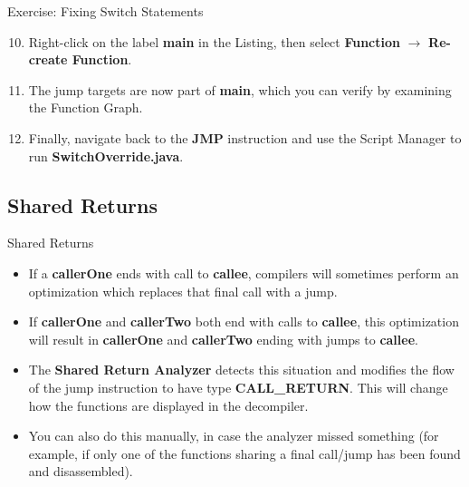 \documentclass{beamer}
\begin{document}
\begin{frame}
\begin{block}{Exercise: Fixing Switch Statements}
\begin{enumerate}
\setcounter{enumi}{9}
\item Right-click on the label \textbf{main} in the Listing, then select \textbf{Function} $\rightarrow$ \textbf{Re-create Function}.
\item The jump targets are now part of \textbf{main}, which you can verify by examining the Function Graph.
\item Finally, navigate back to the \textbf{JMP} instruction and use the Script Manager to run \textbf{SwitchOverride.java}.
\end{enumerate}
\end{block}
\end{frame}

\subsection{Shared Returns}
\begin{frame}
\begin{block}{Shared Returns}
\begin{itemize}
\item If a \textbf{callerOne} ends with call to \textbf{callee}, compilers will sometimes perform an optimization which replaces that final call with a jump.
\item If \textbf{callerOne} and \textbf{callerTwo} both end with calls to \textbf{callee}, this optimization will result in \textbf{callerOne} and \textbf{callerTwo} 
ending with jumps to \textbf{callee}.
\item The \textbf{Shared Return Analyzer} detects this situation and modifies the flow of the jump instruction to have type \textbf{CALL\_RETURN}. This will change how
the functions are displayed in the decompiler.
\item You can also do this manually, in case the analyzer missed something (for example, if only one of the functions sharing a final call/jump has been found and disassembled). 
\end{itemize}
\end{block}
\end{frame}
\end{document}
